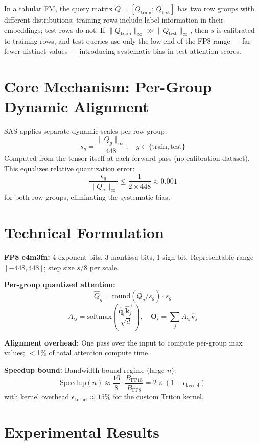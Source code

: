 \documentclass[10pt,twocolumn]{article}
\begin{document}
In a tabular FM, the query matrix $Q = [Q_\text{train};\,Q_\text{test}]$
has two row groups with different distributions: training rows include
label information in their embeddings; test rows do not.
If $\|Q_\text{train}\|_\infty \gg \|Q_\text{test}\|_\infty$, then $s$
is calibrated to training rows, and test queries use only the low end
of the FP8 range --- far fewer distinct values --- introducing systematic
bias in test attention scores.

\section{Core Mechanism: Per-Group Dynamic Alignment}

SAS applies separate dynamic scales per row group:
\[
  s_g = \frac{\|Q_g\|_\infty}{448}, \quad g\in\{\text{train},\text{test}\}
\]
Computed from the tensor itself at each forward pass (no calibration
dataset). This equalizes relative quantization error:
\[
  \frac{\epsilon_q}{\|Q_g\|_\infty} \leq \frac{1}{2\times 448}
  \approx 0.001
\]
for both row groups, eliminating the systematic bias.

\section{Technical Formulation}

\textbf{FP8 e4m3fn:} 4 exponent bits, 3 mantissa bits, 1 sign bit.
Representable range $[-448, 448]$; step size $s/8$ per scale.

\textbf{Per-group quantized attention:}
\[
  \hat{Q}_g = \mathrm{round}(Q_g/s_g)\cdot s_g
\]
\[
  A_{ij} = \mathrm{softmax}\!\left(\frac{\hat{\mathbf{q}}_i
    \hat{\mathbf{k}}_j^\top}{\sqrt{d}}\right),\quad
  \mathbf{O}_i = \sum_j A_{ij}\hat{\mathbf{v}}_j
\]

\textbf{Alignment overhead:} One pass over the input to compute
per-group max values; $<$1\% of total attention compute time.

\textbf{Speedup bound:} Bandwidth-bound regime (large $n$):
\[
  \text{Speedup}(n) \approx \frac{16}{8}\cdot\frac{B_\text{FP16}}{B_\text{FP8}}
  = 2\times\left(1 - \epsilon_\text{kernel}\right)
\]
with kernel overhead $\epsilon_\text{kernel} \approx 15\%$ for the
custom Triton kernel.

\section{Experimental Results}
\end{document}
